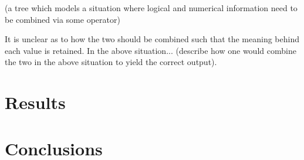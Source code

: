 \documentclass{article}
\begin{document}
(a tree which models a situation where logical and numerical information need to be combined via some operator)

	It is unclear as to how the two should be combined such that the meaning behind each value is retained. In the above situation... (describe how one would combine the two in the above situation to yield the correct output).

\section{Results}

\section{Conclusions}


\end{document}
